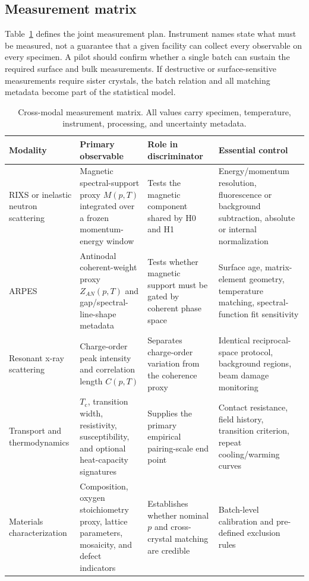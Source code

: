 \documentclass[conference]{IEEEtran}
\newcommand{\Tc}{\ensuremath{T_{\mathrm{c}}}}
\begin{document}
\subsection{Measurement matrix}

Table~\ref{tab:measurementmatrix} defines the joint measurement plan. Instrument names state what must be measured, not a guarantee that a given facility can collect every observable on every specimen. A pilot should confirm whether a single batch can sustain the required surface and bulk measurements. If destructive or surface-sensitive measurements require sister crystals, the batch relation and all matching metadata become part of the statistical model.

\begin{table}[t]
\caption{Cross-modal measurement matrix. All values carry specimen, temperature, instrument, processing, and uncertainty metadata.}
\label{tab:measurementmatrix}
\centering
\small
\begin{tabular}{p{2.25cm}p{3.35cm}p{3.25cm}p{3.25cm}}
\toprule
Modality & Primary observable & Role in discriminator & Essential control \\
\midrule
RIXS or inelastic neutron scattering & Magnetic spectral-support proxy $M(p,T)$ integrated over a frozen momentum-energy window & Tests the magnetic component shared by H0 and H1 & Energy/momentum resolution, fluorescence or background subtraction, absolute or internal normalization \\
ARPES & Antinodal coherent-weight proxy $Z_{AN}(p,T)$ and gap/spectral-line-shape metadata & Tests whether magnetic support must be gated by coherent phase space & Surface age, matrix-element geometry, temperature matching, spectral-function fit sensitivity \\
Resonant x-ray scattering & Charge-order peak intensity and correlation length $C(p,T)$ & Separates charge-order variation from the coherence proxy & Identical reciprocal-space protocol, background regions, beam damage monitoring \\
Transport and thermodynamics & \Tc, transition width, resistivity, susceptibility, and optional heat-capacity signatures & Supplies the primary empirical pairing-scale end point & Contact resistance, field history, transition criterion, repeat cooling/warming curves \\
Materials characterization & Composition, oxygen stoichiometry proxy, lattice parameters, mosaicity, and defect indicators & Establishes whether nominal $p$ and cross-crystal matching are credible & Batch-level calibration and pre-defined exclusion rules \\
\bottomrule
\end{tabular}
\end{table}
\end{document}
